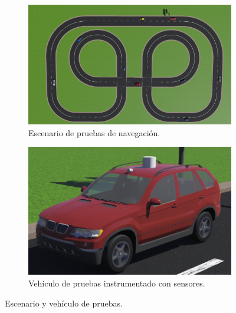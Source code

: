 \begin{figure}[h]
    \centering
    \begin{subfigure}[b]{0.4\textwidth}
         \centering
         \includegraphics[width=\textwidth]{Figures/Figures_Cap03/webots_world.png}
         \caption{Escenario de pruebas de navegación.}
         \label{fig:webots_world}
    \end{subfigure}
    \hfill
    \begin{subfigure}[b]{0.375\textwidth}
         \centering
         \includegraphics[width=\textwidth]{Figures/Figures_Cap03/test_car.png}
         \caption{Vehículo de pruebas instrumentado con sensores.}
         \label{fig:webots_car}
     \end{subfigure}
     
    \caption{Escenario y vehículo de pruebas.}
    \label{fig:world_car_test}
\end{figure}

